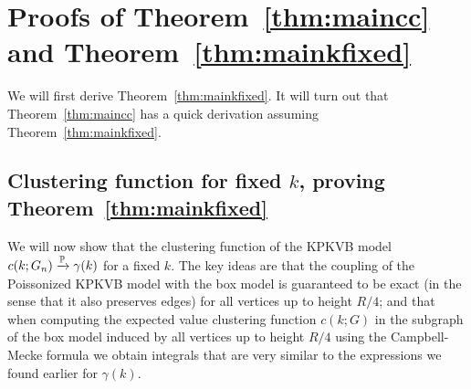 


\section{Proofs of Theorem~\ref{thm:maincc} and Theorem~\ref{thm:mainkfixed}\label{sec:proofs_fixed_k}}


We will first derive Theorem~\ref{thm:mainkfixed}. It will turn out that Theorem~\ref{thm:maincc} has a quick derivation
assuming Theorem~\ref{thm:mainkfixed}.

\subsection{Clustering function for fixed \texorpdfstring{$k$}{k}, proving Theorem~\ref{thm:mainkfixed}}

We will now show that the clustering function of the KPKVB model $c(k;G_n) \xrightarrow{\mathbb{P}} \gamma(k)$ for a fixed $k$. 
The key ideas are that the coupling of the Poissonized KPKVB model with the box model is guaranteed to be exact 
(in the sense that it also preserves edges) for all vertices up to height $R/4$; and that when computing 
the expected value clustering function $c(k;G)$ in the subgraph of the box model induced by all vertices up to height $R/4$
using the Campbell-Mecke formula we obtain integrals that are very similar to the expressions we found earlier for $\gamma(k)$.




